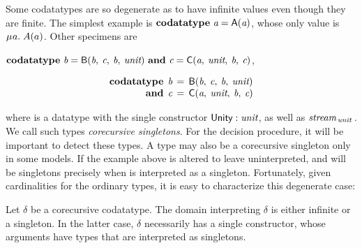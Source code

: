 Some codatatypes are so degenerate as to have infinite values
even though they are finite. The simplest example is
\vthinspace$\textbf{codatatype}~\textit{a} = \textsf{A}(\textit{a})$, whose
only value is $\MU a.\; A(a)$. Other specimens are
\begin{paper}%
\vthinspace$\textbf{codatatype}~\textit{b} = \textsf{B}(\textit{b},\: \textit{c},\: \textit{b},\: \textit{unit})
~\textbf{and}~ \textit{c} = \textsf{C}(\textit{a},\: \textit{unit},\: \textit{b},\: \textit{c})$,
\end{paper}%
\begin{report}%
\[\begin{aligned}[t]
      \textbf{codatatype}\;\, \textit{b} & \,=\, \textsf{B}(\textit{b},\: \textit{c},\: \textit{b},\: \textit{unit}) \\[-1\jot]
      \textbf{and}\;\, \textit{c} & \,=\, \textsf{C}(\textit{a},\: \textit{unit},\: \textit{b},\: \textit{c})
\end{aligned}
\]
\end{report}
where  is a datatype with the single constructor $\textsf{Unity} :
\textit{unit}$, as well as $\textit{stream}_{\,\textit{unit}\,}$. We call such types
\emph{corecursive singletons}. For the decision procedure, it will be
important to detect these types. %
A type may also be a corecursive singleton only in some models. If the example
above is altered to leave  uninterpreted,  and  will be
singletons precisely when  is interpreted as a singleton.
Fortunately, given cardinalities for the ordinary types, it is easy to
characterize this degenerate case:


\begin{lemma}%
\label{lem:corecursive-singletons}%
\afterDot
Let $\delta$ be a corecursive codatatype. The domain interpreting $\delta$ is
either infinite or a singleton. In the latter case, $\delta$ necessarily has a
single constructor, whose arguments have types that are interpreted as
singletons.
\end{lemma}

